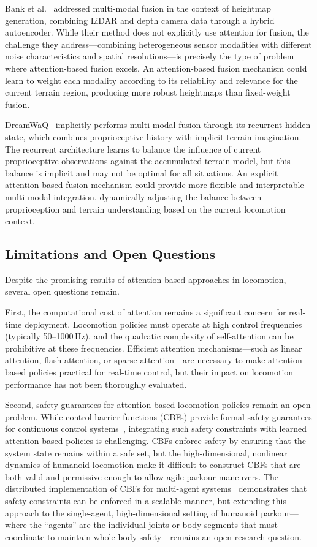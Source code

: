 Bank et al.~\cite{bank2024hybrid} addressed multi-modal fusion in the context of heightmap generation, combining LiDAR and depth camera data through a hybrid autoencoder. While their method does not explicitly use attention for fusion, the challenge they address---combining heterogeneous sensor modalities with different noise characteristics and spatial resolutions---is precisely the type of problem where attention-based fusion excels. An attention-based fusion mechanism could learn to weight each modality according to its reliability and relevance for the current terrain region, producing more robust heightmaps than fixed-weight fusion.

DreamWaQ~\cite{nahraendra2024dreamwaq} implicitly performs multi-modal fusion through its recurrent hidden state, which combines proprioceptive history with implicit terrain imagination. The recurrent architecture learns to balance the influence of current proprioceptive observations against the accumulated terrain model, but this balance is implicit and may not be optimal for all situations. An explicit attention-based fusion mechanism could provide more flexible and interpretable multi-modal integration, dynamically adjusting the balance between proprioception and terrain understanding based on the current locomotion context.

\subsection{Limitations and Open Questions}

Despite the promising results of attention-based approaches in locomotion, several open questions remain.

First, the computational cost of attention remains a significant concern for real-time deployment. Locomotion policies must operate at high control frequencies (typically 50--1000\,Hz), and the quadratic complexity of self-attention can be prohibitive at these frequencies. Efficient attention mechanisms---such as linear attention, flash attention, or sparse attention---are necessary to make attention-based policies practical for real-time control, but their impact on locomotion performance has not been thoroughly evaluated.

Second, safety guarantees for attention-based locomotion policies remain an open problem. While control barrier functions (CBFs) provide formal safety guarantees for continuous control systems~\cite{tan2024distributed}, integrating such safety constraints with learned attention-based policies is challenging. CBFs enforce safety by ensuring that the system state remains within a safe set, but the high-dimensional, nonlinear dynamics of humanoid locomotion make it difficult to construct CBFs that are both valid and permissive enough to allow agile parkour maneuvers. The distributed implementation of CBFs for multi-agent systems~\cite{tan2024distributed} demonstrates that safety constraints can be enforced in a scalable manner, but extending this approach to the single-agent, high-dimensional setting of humanoid parkour---where the ``agents'' are the individual joints or body segments that must coordinate to maintain whole-body safety---remains an open research question.

